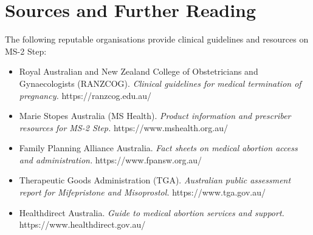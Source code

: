 \section*{Sources and Further Reading}
The following reputable organisations provide clinical guidelines and resources on MS-2 Step:
\begin{itemize}
    \item Royal Australian and New Zealand College of Obstetricians and Gynaecologists (RANZCOG). \textit{Clinical guidelines for medical termination of pregnancy.} https://ranzcog.edu.au/
    \item Marie Stopes Australia (MS Health). \textit{Product information and prescriber resources for MS-2 Step.} https://www.mshealth.org.au/
    \item Family Planning Alliance Australia. \textit{Fact sheets on medical abortion access and administration.} https://www.fpansw.org.au/
    \item Therapeutic Goods Administration (TGA). \textit{Australian public assessment report for Mifepristone and Misoprostol.} https://www.tga.gov.au/
    \item Healthdirect Australia. \textit{Guide to medical abortion services and support.} https://www.healthdirect.gov.au/
\end{itemize}

\clearpage
